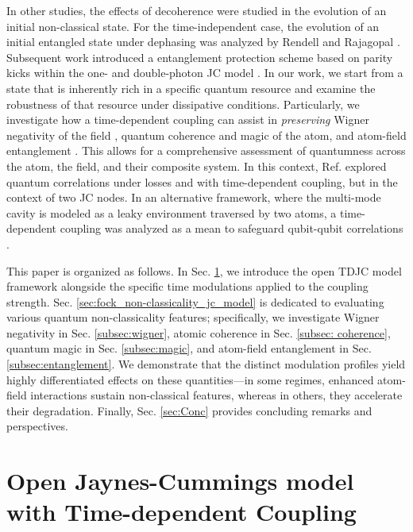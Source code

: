 \documentclass[aps,pre,superscriptaddress,twocolumn,10pt]{revtex4-2}
\begin{document}
In other studies, the effects of decoherence were studied in the evolution of an initial non-classical state.
For the time-independent case, the evolution of an initial entangled state under dephasing was analyzed by Rendell and Rajagopal \cite{Rendell2003}. 
Subsequent work introduced a entanglement protection scheme based on parity kicks \cite{Vitali1999} within the one- and double-photon JC model \cite{Fasihi2019}.
In our work, we start from a state that is inherently rich in a specific quantum resource \cite{Plenio2014,Chitambar2019} and examine the robustness of that resource under dissipative conditions.
Particularly, we investigate how a time-dependent coupling can assist in \emph{preserving} Wigner negativity of the field \cite{Wigner1932,Schrodinger1935,Albarelli2018}, quantum coherence \cite{Streltsov2017} and magic \cite{Bravyi2005} of the atom, and atom-field entanglement \cite{Vidal2002,Horodecki2009}.
This allows for a comprehensive assessment of quantumness across the atom, the field, and their composite system.
In this context, Ref. \cite{Raffah2020} explored quantum correlations under losses and with time-dependent coupling, but in the context of two JC nodes.
In an alternative framework, where the multi-mode cavity is modeled as a leaky environment traversed by two atoms, a time-dependent coupling was analyzed as a mean to safeguard qubit-qubit correlations
\cite{Mortezapour2017a,Golkar2020a,Golkar2020b,Nosrati2020,Mojaveri2022}.

This paper is organized as follows. 
In Sec. \ref{sec:jc_model}, we introduce the open TDJC model framework alongside the specific time modulations applied to the coupling strength. 
Sec. \ref{sec:fock_non-classicality_jc_model} is dedicated to evaluating various quantum non-classicality features; specifically, we investigate Wigner negativity in Sec. \ref{subsec:wigner}, atomic coherence in Sec. \ref{subsec: coherence}, quantum magic in Sec. \ref{subsec:magic}, and atom-field entanglement in Sec. \ref{subsec:entanglement}. We demonstrate that the distinct modulation profiles yield highly differentiated effects on these quantities—in some regimes, enhanced atom-field interactions sustain non-classical features, whereas in others, they accelerate their degradation. Finally, Sec. \ref{sec:Conc} provides concluding remarks and perspectives. 
\section{Open Jaynes-Cummings model with Time-dependent Coupling}
\label{sec:jc_model}
\end{document}
